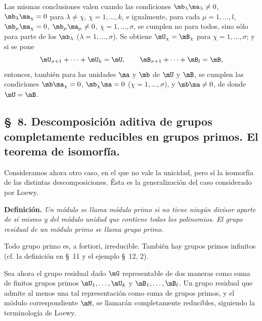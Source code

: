 \documentclass[11pt]{article}
\begin{document}
Las mismas conclusiones valen cuando las condiciones $\mb_\lambda\ma_\lambda\ne0$, $\mb_\lambda\ma_\chi=0$ para $\lambda\ne\chi$, $\chi=1,\ldots,k$, e igualmente, para cada $\mu=1,\ldots,l$, $\mb_\mu\ma_\chi=0$, $\mb_\mu\ma_\mu\ne0$, $\chi=1,\ldots,\sigma$, se cumplen no para todos, sino sólo para parte de los $\mb_\lambda$ ($\lambda=1,\ldots,\sigma$). Se obtiene $\mU_\chi=\mB_\chi$ para $\chi=1,\ldots,\sigma$; y si se pone
\[
 \mU_{\sigma+1}+\cdots+\mU_k=\mU,
 \qquad
 \mB_{\sigma+1}+\cdots+\mB_l=\mB,
\]
entonces, también para las unidades $\ma$ y $\mb$ de $\mU$ y $\mB$, se cumplen las condiciones $\mb\ma_\chi=0$, $\mb_\chi\ma=0$ ($\chi=1,\ldots,\sigma$), y $\mb\ma\ne0$, de donde $\mU=\mB$.

\subsection*{\S~8. Descomposición aditiva de grupos completamente reducibles en grupos primos. El teorema de isomorfía.}

Consideramos ahora otro caso, en el que no vale la unicidad, pero sí la isomorfía de las distintas descomposiciones. Ésta es la generalización del caso considerado por Loewy.

\textbf{Definición.} \emph{Un módulo se llama módulo primo si no tiene ningún divisor aparte de sí mismo y del módulo unidad que contiene todos los polinomios. El grupo residual de un módulo primo se llama grupo primo.}

Todo grupo primo es, a fortiori, irreducible. También hay grupos primos infinitos (cf. la definición en \S~11 y el ejemplo \S~12, 2).

Sea ahora el grupo residual dado $\mG$ representable de dos maneras como suma de finitos grupos primos $\mU_1,\ldots,\mU_k$ y $\mB_1,\ldots,\mB_l$. Un grupo residual que admite al menos una tal representación como suma de grupos primos, y el módulo correspondiente $\mM$, se llamarán completamente reducibles, siguiendo la terminología de Loewy.
\end{document}
